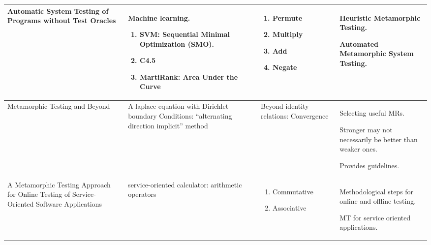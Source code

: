 \begin{singlespace}
\begin{longtable}[c]{| p{3cm} | p{4cm} | p{3.5cm} | p{4cm} |}
  \hline

  Automatic System Testing of Programs without Test Oracles             &
  Machine learning.
  \begin{enumerate}
    \item SVM: Sequential Minimal Optimization (SMO).
    \item C4.5
    \item MartiRank: Area Under the Curve
  \end{enumerate}                                        &
  \begin{enumerate}
    \item Permute
    \item Multiply
    \item Add
    \item Negate
  \end{enumerate}                                          &
  Heuristic Metamorphic Testing.\par\medskip
  Automated Metamorphic System Testing.  \\

  \hline

  Metamorphic Testing and Beyond             &
  A laplace equation with Dirichlet boundary Conditions: “alternating direction implicit” method                                        &
  Beyond identity relations: Convergence                                          &
  Selecting useful MRs. \par\medskip
  Stronger may not necessarily be better than weaker ones. \par\medskip
  Provides guidelines.  \\

  \hline

  A Metamorphic Testing Approach for Online Testing of Service-Oriented Software Applications             &
  service-oriented calculator: arithmetic operators                                        &
  \begin{enumerate}
    \item Commutative
    \item Associative
  \end{enumerate}                                         &
  Methodological steps for online and offline testing. \par\medskip
  MT for service oriented applications.  \\

  \hline

 \end{longtable}
\end{singlespace}
